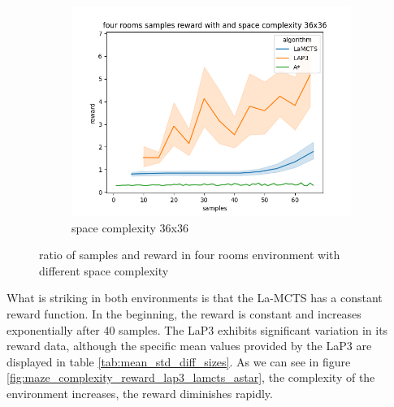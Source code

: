 \documentclass[bibliography=totoc]{scrartcl}
\begin{document}
\begin{figure}[H]
	\begin{subfigure}[b]{0.3\linewidth}
		\includegraphics[width=\linewidth]{img/four_rooms_samples__reward_b_8_LAP3_MCTS_AStar_interrupted_36.png}
        \caption{space complexity 36x36}
	\end{subfigure}
	\caption{ratio of samples and reward in four rooms environment with different space complexity}
	\label{fig:SampleRewardFourRoomsDifferentSpaceComplexity}
\end{figure}

What is striking in both environments is that the \ac{La-MCTS} has a constant reward function. 
In the beginning, the reward is constant and increases exponentially after 40 samples.
The \ac{LaP3} exhibits significant variation in its reward data, although the specific mean values provided by the \ac{LaP3} are displayed in table \ref{tab:mean_std_diff_sizes}. 
As we can see in figure \ref{fig:maze_complexity_reward_lap3_lamcts_astar}, the complexity of the environment increases, the reward diminishes rapidly.
\end{document}
